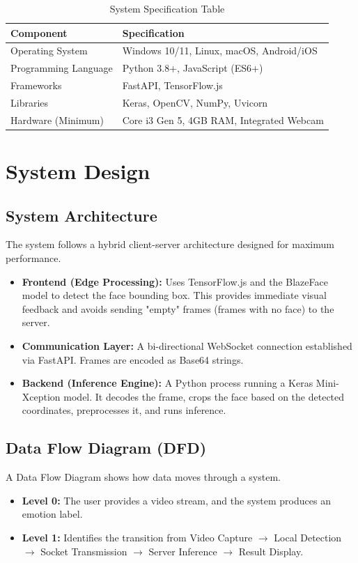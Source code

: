 \documentclass[12pt,a4paper]{report}
\begin{document}
\begin{table}[H]
\centering
\begin{tabular}{|l|l|}
\hline
\textbf{Component} & \textbf{Specification} \\ \hline
Operating System & Windows 10/11, Linux, macOS, Android/iOS \\ \hline
Programming Language & Python 3.8+, JavaScript (ES6+) \\ \hline
Frameworks & FastAPI, TensorFlow.js \\ \hline
Libraries & Keras, OpenCV, NumPy, Uvicorn \\ \hline
Hardware (Minimum) & Core i3 Gen 5, 4GB RAM, Integrated Webcam \\ \hline
\end{tabular}
\caption{System Specification Table}
\end{table}

\clearpage

\chapter{System Design}

\section{System Architecture}
The system follows a hybrid client-server architecture designed for maximum performance.
\begin{itemize}
    \item \textbf{Frontend (Edge Processing):} Uses TensorFlow.js and the BlazeFace model to detect the face bounding box. This provides immediate visual feedback and avoids sending "empty" frames (frames with no face) to the server.
    \item \textbf{Communication Layer:} A bi-directional WebSocket connection established via FastAPI. Frames are encoded as Base64 strings.
    \item \textbf{Backend (Inference Engine):} A Python process running a Keras Mini-Xception model. It decodes the frame, crops the face based on the detected coordinates, preprocesses it, and runs inference.
\end{itemize}

\section{Data Flow Diagram (DFD)}
A Data Flow Diagram shows how data moves through a system.
\begin{itemize}
    \item \textbf{Level 0:} The user provides a video stream, and the system produces an emotion label.
    \item \textbf{Level 1:} Identifies the transition from Video Capture $\rightarrow$ Local Detection $\rightarrow$ Socket Transmission $\rightarrow$ Server Inference $\rightarrow$ Result Display.
\end{itemize}
\end{document}

